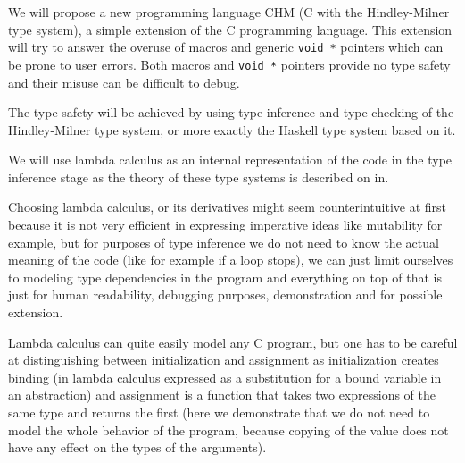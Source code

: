 

We will propose a new programming language CHM (C with the Hindley-Milner type system), a simple extension of the C programming language. This extension will try to answer the overuse of macros and generic \lstinline{void *} pointers which can be prone to user errors. Both macros and \lstinline{void *} pointers provide no type safety and their misuse can be difficult to debug.

The type safety will be achieved by using type inference and type checking of the Hindley-Milner type system, or more exactly the Haskell type system based on it.

We will use lambda calculus as an internal representation of the code in the type inference stage as the theory of these type systems is described on in.

Choosing lambda calculus, or its derivatives might seem counterintuitive at first because it is not very efficient in expressing imperative ideas like mutability for example, but for purposes of type inference we do not need to know the actual meaning of the code (like for example if a loop stops), we can just limit ourselves to modeling type dependencies in the program and everything on top of that is just for human readability, debugging purposes, demonstration and for possible extension.

Lambda calculus can quite easily model any C program, but one has to be careful at distinguishing between initialization and assignment as initialization creates binding (in lambda calculus expressed as a substitution for a bound variable in an abstraction) and assignment is a function that takes two expressions of the same type and returns the first (here we demonstrate that we do not need to model the whole behavior of the program, because copying of the value does not have any effect on the types of the arguments).
